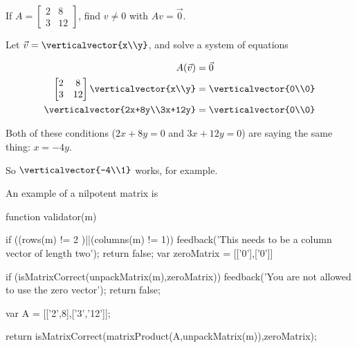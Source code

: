 \documentclass{ximera}
\begin{document}
\begin{question}
  If $A = \begin{bmatrix} 2 & 8\\3&12\end{bmatrix}$, find $v \neq 0$ with $Av = \vec{0}$.
  \begin{solution}
  \begin{hint}
  	Let $\vec{v} = \verticalvector{x\\y}$, and solve a system of equations
  \end{hint}
  \begin{hint}
  	\begin{align*}
  		A(\vec{v}) &= \vec{0}\\
  		\begin{bmatrix} 2 & 8\\3&12\end{bmatrix}\verticalvector{x\\y}  &=\verticalvector{0\\0}\\
  		\verticalvector{2x+8y\\3x+12y} &= \verticalvector{0\\0}
  	\end{align*}
  \end{hint}
  \begin{hint}
  	Both of these conditions ($2x+8y  =0$ and $3x+12y = 0$) are saying the same thing:  $x = -4y$.
  \end{hint}
  \begin{hint}
  	So $\verticalvector{-4\\1}$ works, for example.
  \end{hint}
  
  	An example of a nilpotent matrix is
  	
  	\begin{matrix-answer}[name=v]
  		function validator(m){
  		if ((rows(m) != 2 )||(columns(m) != 1)){
  			feedback('This needs to be a column vector of length two');
  			return false;
  			}
  		var zeroMatrix = [['0'],['0']]
  		
  		if (isMatrixCorrect(unpackMatrix(m),zeroMatrix)){
  			feedback('You are not allowed to use the zero vector');
  			return false;
  			}
  		
  		var A = [['2',8],['3','12']];
  		
  		return isMatrixCorrect(matrixProduct(A,unpackMatrix(m)),zeroMatrix);
  		}
  	\end{matrix-answer}
  \end{solution}
\end{question}
	
\end{document}

